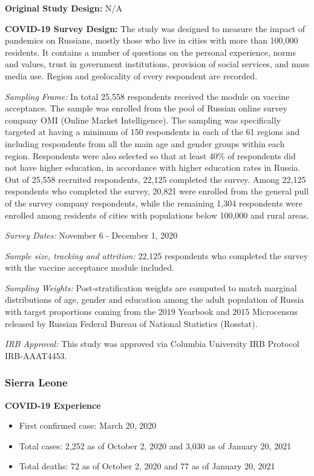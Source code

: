\documentclass[
  12pt,
]{article}
\begin{document}
\textbf{Original Study Design:} N/A

\textbf{COVID-19 Survey Design:} The study was designed to measure the impact of pandemics on Russians, mostly those who live in cities with more than 100,000 residents. It contains a number of questions on the personal experience, norms and values, trust in government institutions, provision of social services, and mass media use. Region and geolocality of every respondent are recorded.

\emph{Sampling Frame:} In total 25,558 respondents received the module on vaccine acceptance. The sample was enrolled from the pool of Russian online survey company OMI (Online Market Intelligence). The sampling was specifically targeted at having a minimum of 150 respondents in each of the 61 regions and including respondents from all the main age and gender groups within each region. Respondents were also selected so that at least 40\% of respondents did not have higher education, in accordance with higher education rates in Russia. Out of 25,558 recruited respondents, 22,125 completed the survey. Among 22,125 respondents who completed the survey, 20,821 were enrolled from the general pull of the survey company respondents, while the remaining 1,304 respondents were enrolled among residents of cities with populations below 100,000 and rural areas.

\emph{Survey Dates:} November 6 - December 1, 2020

\emph{Sample size, tracking and attrition:} 22,125 respondents who completed the survey with the vaccine acceptance module included.

\emph{Sampling Weights:} Post-stratification weights are computed to match marginal distributions of age, gender and education among the adult population of Russia with target proportions coming from the 2019 Yearbook and 2015 Microcensus released by Russian Federal Bureau of National Statistics (Rosstat).

\emph{IRB Approval:} This study was approved via Columbia University IRB Protocol IRB-AAAT4453.

\hypertarget{sierra-leone}{%
\subsubsection*{Sierra Leone}\label{sierra-leone}}

\textbf{COVID-19 Experience}

\begin{itemize}
        \item First confirmed case: March 20, 2020
        \item Total cases:  2,252 as of October 2, 2020 and 3,030 as of January 20, 2021 
        \item Total deaths:  72 as of October 2, 2020 and 77 as of January 20, 2021 
\end{itemize}
\end{document}
